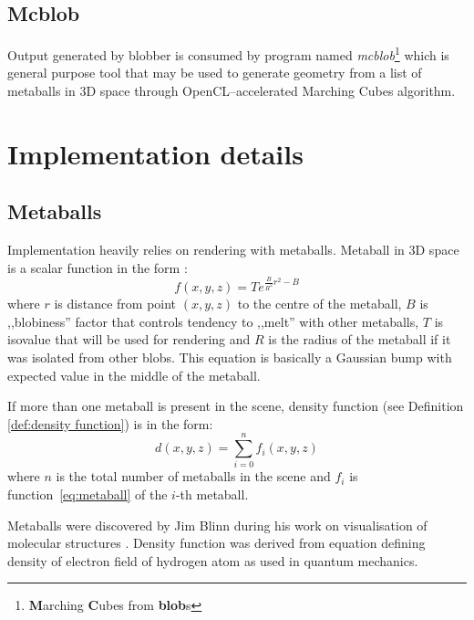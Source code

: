 \subsection{Mcblob}
Output generated by blobber is consumed by program named \emph{mcblob}\footnote{\textbf{M}arching
\textbf{C}ubes from \textbf{blob}s} which is general purpose tool that may be used to
generate geometry from a list of metaballs in 3D space through OpenCL--accelerated
 Marching Cubes algorithm.

\section{Implementation details}
\subsection{Metaballs}
Implementation heavily relies on rendering with metaballs. Metaball in 3D space
is a scalar function in the form \parencite[p. 4]{Blinn:1982:GAS:357306.357310}:
\begin{equation}
  f(x,y,z)=Te^{\frac{B}{R^2}r^2 - B}
  \label{eq:metaball}
\end{equation}
where $r$ is distance from point $(x,y,z)$ to the centre of the metaball, $B$ is
,,blobiness'' factor that controls tendency to ,,melt'' with other metaballs, $T$
is isovalue that will be used for rendering and $R$ is the radius of the
metaball if it was isolated from other blobs. This equation is basically a
Gaussian bump with expected value in the middle of the metaball.

If more than one metaball is present in the scene, density function (see Definition
\autoref{def:density function})
is in the form:
\begin{equation}
  d(x,y,z) = \sum_{i=0}^{n} f_i(x,y,z)
  \label{eq:metaballdensity}
\end{equation}
where $n$ is the total number of metaballs in the scene and $f_i$ is function~\ref{eq:metaball}
of the $i$-th metaball.

Metaballs were discovered by Jim Blinn during his work on visualisation of
molecular structures \parencite{Blinn:1982:GAS:357306.357310}. Density function 
was derived from equation defining density of electron field of hydrogen atom
as used in quantum mechanics.

